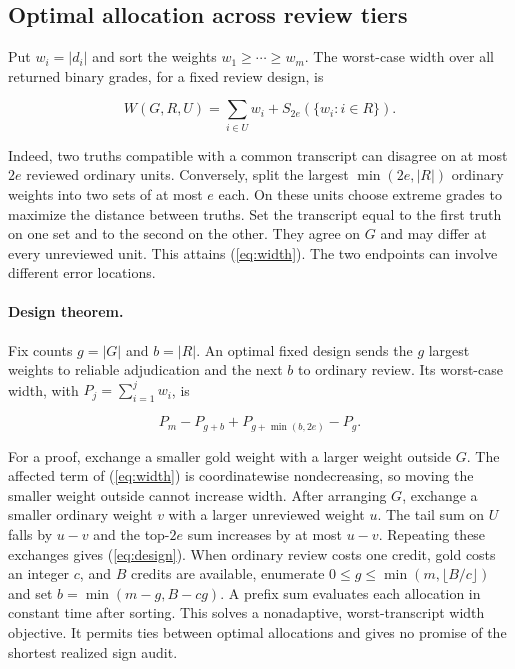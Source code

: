 \documentclass[10pt,letterpaper]{article}
\begin{document}
\subsection*{Optimal allocation across review tiers}
Put $w_i=|d_i|$ and sort the weights $w_1\geq\cdots\geq w_m$. The worst-case width over all returned binary grades, for a fixed review design, is
\begin{linenomath}
\begin{equation}
 W(G,R,U)=\sum_{i\in U}w_i + S_{2e}(\{w_i:i\in R\}). \label{eq:width}
\end{equation}
\end{linenomath}
Indeed, two truths compatible with a common transcript can disagree on at most $2e$ reviewed ordinary units. Conversely, split the largest $\min(2e,|R|)$ ordinary weights into two sets of at most $e$ each. On these units choose extreme grades to maximize the distance between truths. Set the transcript equal to the first truth on one set and to the second on the other. They agree on $G$ and may differ at every unreviewed unit. This attains (\ref{eq:width}). The two endpoints can involve different error locations.

\paragraph{Design theorem.}
Fix counts $g=|G|$ and $b=|R|$. An optimal fixed design sends the $g$ largest weights to reliable adjudication and the next $b$ to ordinary review. Its worst-case width, with $P_j=\sum_{i=1}^j w_i$, is
\begin{linenomath}
\begin{equation}
 P_m-P_{g+b}+P_{g+\min(b,2e)}-P_g. \label{eq:design}
\end{equation}
\end{linenomath}
For a proof, exchange a smaller gold weight with a larger weight outside $G$. The affected term of (\ref{eq:width}) is coordinatewise nondecreasing, so moving the smaller weight outside cannot increase width. After arranging $G$, exchange a smaller ordinary weight $v$ with a larger unreviewed weight $u$. The tail sum on $U$ falls by $u-v$ and the top-$2e$ sum increases by at most $u-v$. Repeating these exchanges gives (\ref{eq:design}). When ordinary review costs one credit, gold costs an integer $c$, and $B$ credits are available, enumerate $0\leq g\leq\min(m,\lfloor B/c\rfloor)$ and set $b=\min(m-g,B-cg)$. A prefix sum evaluates each allocation in constant time after sorting. This solves a nonadaptive, worst-transcript width objective. It permits ties between optimal allocations and gives no promise of the shortest realized sign audit.
\end{document}
